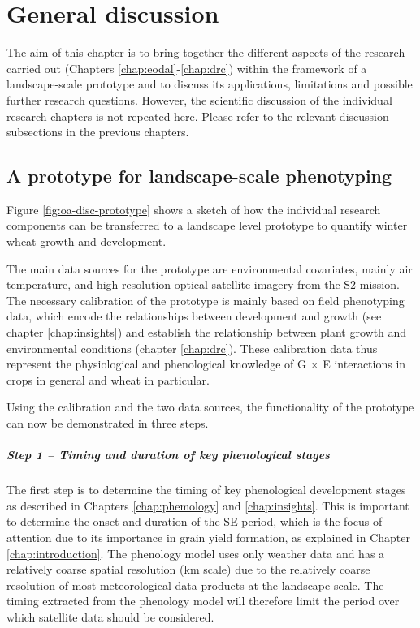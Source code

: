 \chapter{General discussion}
\label{chap:general-discussion}

The aim of this chapter is to bring together the different aspects of the research carried out (Chapters \ref{chap:eodal}-\ref{chap:drc}) within the framework of a landscape-scale prototype and to discuss its applications, limitations and possible further research questions. However, the scientific discussion of the individual research chapters is not repeated here. Please refer to the relevant discussion subsections in the previous chapters.

\section{A prototype for landscape-scale phenotyping}
Figure \ref{fig:oa-disc-prototype} shows a sketch of how the individual research components can be transferred to a landscape level prototype to quantify winter wheat growth and development.

The main data sources for the prototype are environmental covariates, mainly air temperature, and high resolution optical satellite imagery from the \gls{S2} mission. The necessary calibration of the prototype is mainly based on field phenotyping data, which encode the relationships between development and growth (see chapter \ref{chap:insights}) and establish the relationship between plant growth and environmental conditions (chapter \ref{chap:drc}). These calibration data thus represent the physiological and phenological knowledge of G $\times$ E interactions in crops in general and wheat in particular.

Using the calibration and the two data sources, the functionality of the prototype can now be demonstrated in three steps.

\paragraph{Step 1 -- Timing and duration of key phenological stages}
The first step is to determine the timing of key phenological development stages as described in Chapters \ref{chap:phemology} and \ref{chap:insights}. This is important to determine the onset and duration of the \gls{SE} period, which is the focus of attention due to its importance in grain yield formation, as explained in Chapter \ref{chap:introduction}. The phenology model uses only weather data and has a relatively coarse spatial resolution (km scale) due to the relatively coarse resolution of most meteorological data products at the landscape scale. The timing extracted from the phenology model will therefore limit the period over which satellite data should be considered.

